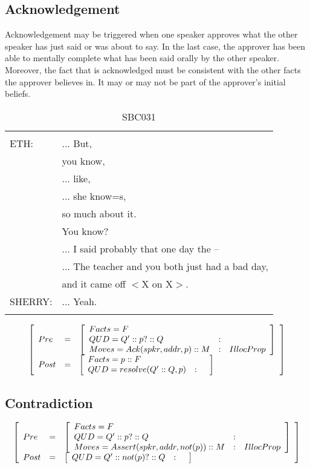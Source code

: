 \documentclass[11pt]{article}
\newenvironment{sbcquote}[2]
{
	\def\savedcaption{\caption{#1}}%
	\def\savedlabel{\label{#2}}%
	\begin{table}[h]
		\centering
		\begin{small}
		\begin{tabular}{ll}
			\hline
			& \\
}
{
	& \\
	\hline
	\end{tabular}
	\end{small}
	\savedcaption
	\savedlabel
\end{table}
}
\newenvironment{recenv}
{\left[\begin{array}{lll}}
{\end{array}\right]}
\begin{document}
			\subsection{Acknowledgement}
				Acknowledgement may be triggered when one speaker approves what the other speaker has just said or was about to say. In the last case, the approver has been able to mentally complete what has been said orally by the other speaker. Moreover, the fact that is acknowledged must be consistent with the other facts the approver believes in. It may or may not be part of the approver's initial  beliefs.
	
				\begin{sbcquote}{SBC031}
					BETH:&	... But,\\
					&you know,\\
					&... like,\\
					&... she know=s,\\
					&so much about it.\\
					&You know?\\
					&... I said probably that one day the --\\
					&... The teacher and you both just had a bad day,\\
					&and it came off $<$X on X$>$.\\
					SHERRY:&	... Yeah.\\
				\end{sbcquote}
				\begin{equation*}
				\begin{recenv}
				Pre  &=& \begin{recenv}
				Facts = F\\
				QUD = Q' :: p? :: Q &:& \\
				Moves = Ack(spkr, addr, p) :: M &:& IllocProp
				\end{recenv}\\
				Post &=& \begin{recenv}
				Facts = p :: F\\
				QUD = resolve(Q' :: Q, p) &:& 
				\end{recenv}
				\end{recenv}
				\end{equation*}
			\subsection{Contradiction} \label{contradiction}
				\begin{equation*}
				\begin{recenv}
				Pre  &=& \begin{recenv}
				Facts = F\\
				QUD = Q' :: p? :: Q &:& \\
				Moves = Assert(spkr, addr, not(p)) :: M &:& IllocProp
				\end{recenv}\\
				Post &=& \begin{recenv}
				QUD = Q' :: not(p)? :: Q &:& 
				\end{recenv}
				\end{recenv}
				\end{equation*}
				
\end{document}
